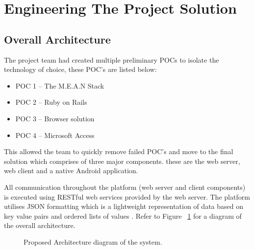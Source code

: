 \documentclass[12pt]{witseiepaper}
\begin{document}
\section{Engineering The Project Solution}

\subsection{Overall Architecture}
The project team had created multiple preliminary POCs to isolate the technology of choice, these POC's are listed below:

\begin{itemize}
	\item POC 1 – The M.E.A.N Stack
	\item POC 2 – Ruby on Rails
	\item POC 3 – Browser solution
	\item POC 4 – Microsoft Access
\end{itemize}

 This allowed the team to quickly remove failed POC's and move to the final solution which comprises of three major components. these are the web server, web client and a native Android application.


All communication throughout the platform (web server and client components) is executed using RESTful web services provided by the web server. The platform utilises JSON formatting which is a lightweight representation of data based on key value pairs and ordered lists of values \cite{JSON}. Refer to Figure ~\ref{fig:Arch} for a diagram of the overall architecture.

\begin{figure}[H]
  \caption{Proposed Architecture diagram of the system.} 
  \label{fig:Arch}
\end{figure}
\end{document}
